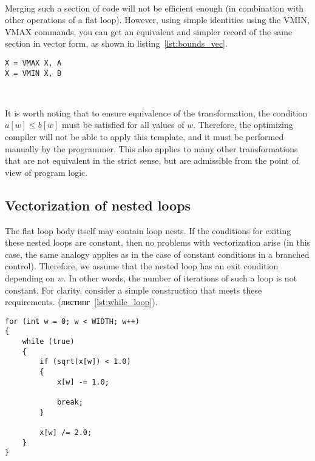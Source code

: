 \documentclass[
11pt,%
tightenlines,%
twoside,%
onecolumn,%
nofloats,%
nobibnotes,%
nofootinbib,%
superscriptaddress,%
noshowpacs,%
centertags]%
{revtex4}
\begin{document}
\

Merging such a section of code will not be efficient enough (in  combination with other operations of a flat loop).
However, using simple identities using the VMIN, VMAX commands, you can get an equivalent and simpler record of the same section in vector form, as shown in listing~\ref{lst:bounds_vec}.

\begin{lstlisting}[caption={Векторизованная форма ограничения значения величины с помощью нижней и верхней границ.},label={lst:bounds_vec}]
X = VMAX X, A
X = VMIN X, B
\end{lstlisting}

\

It is worth noting that to ensure equivalence of the transformation, the condition $a[w] \le b[w]$ must be satisfied for all values of $w$.
Therefore, the optimizing compiler will not be able to apply this template, and it must be performed manually by the programmer.
This also applies to many other transformations that are not equivalent in the strict sense, but are admissible from the point of view of program logic.

\subsection{Vectorization of nested loops}

The flat loop body itself may contain loop nests.
If the conditions for exiting these nested loops are constant, then no problems with vectorization arise (in this case, the same analogy applies as in the case of constant conditions in a branched control).
Therefore, we assume that the nested loop has an exit condition depending on $w$.
In other words, the number of iterations of such a loop is not constant.
For clarity, consider a simple construction that meets these requirements. (листинг~\ref{lst:while_loop}).

\begin{lstlisting}[caption={Flat loop containing a loop with a non-constant number of iterations},label={lst:while_loop}]
for (int w = 0; w < WIDTH; w++)
{
    while (true)
    {
        if (sqrt(x[w]) < 1.0)
        {
            x[w] -= 1.0;

            break;
        }
            
        x[w] /= 2.0;
    }
}
\end{lstlisting}

\
\end{document}
